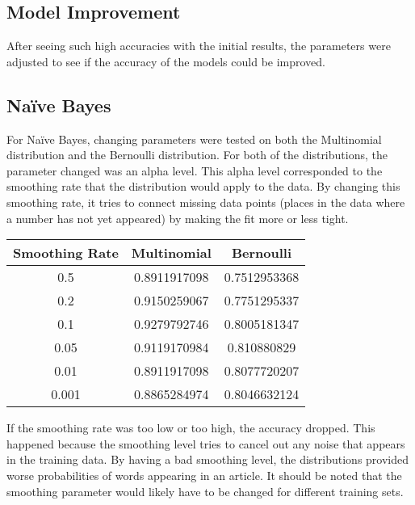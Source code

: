 \documentclass[fleqn,11pt]{article}
\begin{document}
\begin{multicols}{2}
    \section{Model Improvement}
    After seeing such high accuracies with the initial results, the parameters were adjusted to 
    see if the accuracy of the models could be improved.
        \subsection{Na\"ive Bayes}
        For Na\"ive Bayes, changing parameters were tested on both the Multinomial distribution 
        and the Bernoulli distribution. For both of the distributions, the parameter changed was 
        an alpha level. This alpha level corresponded to the smoothing rate that the distribution 
        would apply to the data. By changing this smoothing rate, it tries to connect missing data 
        points (places in the data where a number has not yet appeared) by making the fit more or 
        less tight.
        \begin{center}
            \begin{tabular}{|c|c|c|}
                \hline
                Smoothing Rate & Multinomial & Bernoulli \\
                \hline
                0.5 & 0.8911917098 & 0.7512953368 \\
                0.2 & 0.9150259067 & 0.7751295337 \\
                0.1 & 0.9279792746 & 0.8005181347 \\
                0.05 & 0.9119170984 & 0.810880829 \\
                0.01 & 0.8911917098 & 0.8077720207 \\
                0.001 & 0.8865284974 & 0.8046632124 \\
                \hline
            \end{tabular}
        \end{center}
        If the smoothing rate was too low or too high, the accuracy dropped. This happened because 
        the smoothing level tries to cancel out any noise that appears in the training data. By 
        having a bad smoothing level, the distributions provided worse probabilities of words 
        appearing in an article. It should be noted that the smoothing parameter would likely 
        have to be changed for different training sets.

\end{multicols}
\end{document}
